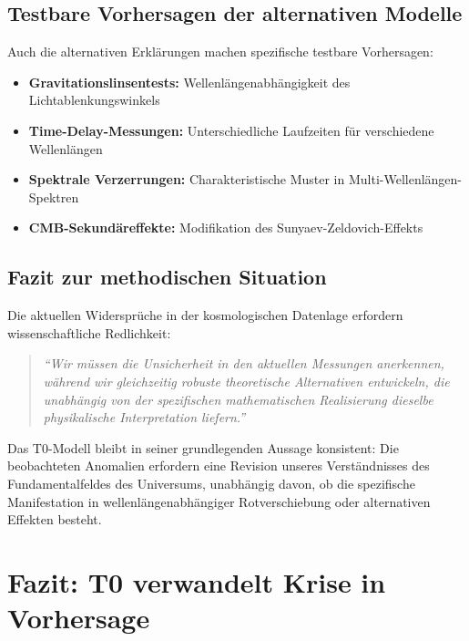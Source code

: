 \documentclass{article}
\begin{document}
	\subsection{Testbare Vorhersagen der alternativen Modelle}
	
	Auch die alternativen Erklärungen machen spezifische testbare Vorhersagen:
	
	\begin{itemize}
		\item \textbf{Gravitationslinsentests:} Wellenlängenabhängigkeit des Lichtablenkungswinkels
		\item \textbf{Time-Delay-Messungen:} Unterschiedliche Laufzeiten für verschiedene Wellenlängen
		\item \textbf{Spektrale Verzerrungen:} Charakteristische Muster in Multi-Wellenlängen-Spektren
		\item \textbf{CMB-Sekundäreffekte:} Modifikation des Sunyaev-Zeldovich-Effekts
	\end{itemize}
	
	\subsection{Fazit zur methodischen Situation}
	
	Die aktuellen Widersprüche in der kosmologischen Datenlage erfordern wissenschaftliche Redlichkeit:
	
	\begin{quote}
		\textit{``Wir müssen die Unsicherheit in den aktuellen Messungen anerkennen, während wir gleichzeitig robuste theoretische Alternativen entwickeln, die unabhängig von der spezifischen mathematischen Realisierung dieselbe physikalische Interpretation liefern.''}
	\end{quote}
	
	Das T0-Modell bleibt in seiner grundlegenden Aussage konsistent: Die beobachteten Anomalien erfordern eine Revision unseres Verständnisses des Fundamentalfeldes des Universums, unabhängig davon, ob die spezifische Manifestation in wellenlängenabhängiger Rotverschiebung oder alternativen Effekten besteht.
	
	\section{Fazit: T0 verwandelt Krise in Vorhersage}
	
\end{document}

